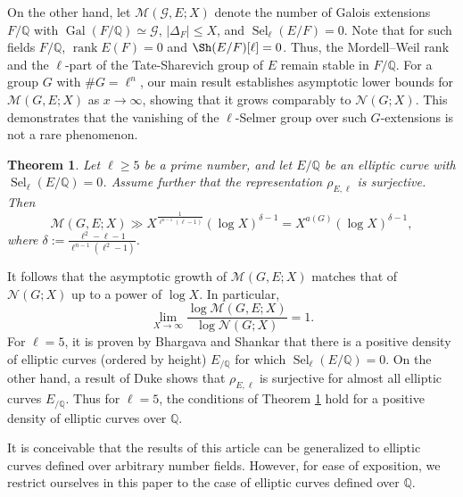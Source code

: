 \documentclass[11pt,reqno]{amsart}
\newtheorem{theorem}{Theorem}[section]
\newcommand{\cG}{\mathcal{G}}
\newcommand{\Q}{\mathbb{Q}}
\newcommand{\op}[1]{\operatorname{#1}}
\numberwithin{equation}{section}
\begin{document}
On the other hand, let \( \mathcal{M}(\cG, E; X) \) denote the number of Galois extensions \( F/\Q \) with \( \operatorname{Gal}(F/\Q) \simeq \cG \), \( |\Delta_F| \leq X \), and \( \operatorname{Sel}_\ell(E/F) = 0 \). Note that for such fields $F/\Q$, $\op{rank}E(F)=0$ and $\Sh(E/F)[\ell]=0$. Thus, the Mordell--Weil rank and the $\ell$-part of the Tate-Sharevich group of $E$ remain stable in $F/\Q$. For a group $G$ with $\# G=\ell^n$, our main result establishes asymptotic lower bounds for \( \mathcal{M}(G, E; X) \) as \( x \to \infty \), showing that it grows comparably to \( \mathcal{N}(G; X) \). This demonstrates that the vanishing of the \( \ell \)-Selmer group over such \( G \)-extensions is not a rare phenomenon.


\begin{theorem}\label{main thm of section 4}
Let \( \ell \geq 5 \) be a prime number, and let \( E/\Q \) be an elliptic curve with \( \operatorname{Sel}_\ell(E/\Q) = 0 \). Assume further that the representation \( \rho_{E,\ell} \) is surjective. Then
\[
\mathcal{M}(G, E; X) \gg X^{\frac{1}{\ell^{n-1}(\ell - 1)}} (\log X)^{\delta - 1} = X^{a(G)} (\log X)^{\delta - 1},
\]
where \( \delta := \frac{\ell^2 - \ell - 1}{\ell^{n-1}(\ell^2 - 1)} \).
\end{theorem}


It follows that the asymptotic growth of \( \mathcal{M}(G, E; X) \) matches that of \( \mathcal{N}(G; X) \) up to a power of \( \log X \). In particular,
\[
\lim_{X \to \infty} \frac{\log \mathcal{M}(G, E; X)}{\log \mathcal{N}(G; X)} = 1.
\]
For $\ell=5$, it is proven by Bhargava and Shankar \cite{bhargavashankar5} that there is a positive density of elliptic curves (ordered by height) $E_{/\Q}$ for which $\op{Sel}_\ell(E/\Q)=0$. On the other hand, a result of Duke \cite{duke} shows that $\rho_{E,\ell}$ is surjective for almost all elliptic curves $E_{/\Q}$. Thus for $\ell=5$, the conditions of Theorem \ref{main thm of section 4} hold for a positive density of elliptic curves over $\mathbb{Q}$.
\par It is conceivable that the results of this article can be generalized to elliptic curves defined over arbitrary number fields. However, for ease of exposition, we restrict ourselves in this paper to the case of elliptic curves defined over $\Q$.
\end{document}

